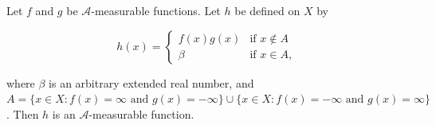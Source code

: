 Let $f$ and $g$ be $\mathcal{A}$-measurable functions. Let $h$ be defined on $X$ by

$$h(x) = \begin{cases} f(x) g(x) & \text{if } x \notin A \\ \beta & \text{if } x \in A, \end{cases}$$

where $\beta$ is an arbitrary extended real number, and $A = \{x \in X : f(x) = \infty \text{ and } g(x) = -\infty\} \cup \{x \in X : f(x) = -\infty \text{ and } g(x) = \infty\}$. Then $h$ is an $\mathcal{A}$-measurable function.